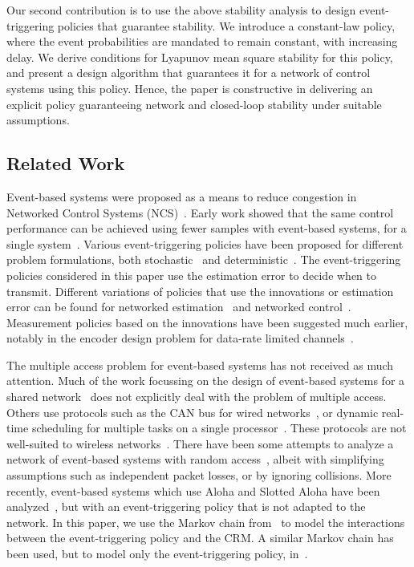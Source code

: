 \documentclass[twocolumn]{autart}
\begin{document}
Our second contribution is to use the above stability analysis to design event-triggering policies that guarantee stability. We introduce a constant-law policy, where the event probabilities are mandated to remain constant, with increasing delay. We derive conditions for Lyapunov mean square stability for this policy, and present a design algorithm that guarantees it for a network of control systems using this policy. Hence, the paper is constructive in delivering an explicit policy guaranteeing network and closed-loop stability under suitable assumptions.

\subsection{Related Work}

Event-based systems were proposed as a means to reduce congestion in Networked Control Systems (NCS)~\cite{Astrom1999,Yook2002,Otanez2002}. Early work showed that the same control performance can be achieved using fewer samples with event-based systems, for a single system~\cite{Tomovic1966,Astrom1999}. Various event-triggering policies have been proposed for different problem formulations, both stochastic~\cite{Rabi2006,Henningsson2008} and deterministic~\cite{Tabuada2007,Heemels2008}. The event-triggering policies considered in this paper use the estimation error to decide when to transmit. Different variations of policies that use the innovations or estimation error can be found for networked estimation~\cite{Xia2013,Han2013} and networked control~\cite{Molin2009,Demirel2013}. Measurement policies based on the innovations have been suggested much earlier, notably in the encoder design problem for data-rate limited channels~\cite{Borkar1997}.

The multiple access problem for event-based systems has not received as much attention. Much of the work focussing on the design of event-based systems for a shared network~\cite{Wang2011,Molin2012} does not explicitly deal with the problem of multiple access. Others use protocols such as the CAN bus for wired networks~\cite{Anta2009a}, or dynamic real-time scheduling for multiple tasks on a single processor~\cite{Tabuada2007}. These protocols are not well-suited to wireless networks~\cite{Akyildiz1999,Gummalla2000}. There have been some attempts to analyze a network of event-based systems with random access~\cite{Cervin2008,Rabi2009,Henningsson2010}, albeit with simplifying assumptions such as independent packet losses, or by ignoring collisions. More recently, event-based systems which use Aloha and Slotted Aloha have been analyzed~\cite{Blind2011a}, but with an event-triggering policy that is not adapted to the network. In this paper, we use the Markov chain from~\cite{Ramesh2011b} to model the interactions between the event-triggering policy and the CRM. A similar Markov chain has been used, but to model only the event-triggering policy, in~\cite{Demirel2013,Xia2013}.
\end{document}
